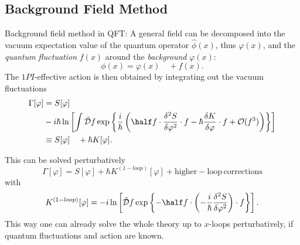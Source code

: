 \subsection{Background Field Method}
\begin{mybox}{Background field method in QFT:}
A general field can be decomposed into the vacuum expectation value of the quantum operator $\hat{\phi}(x)$, thus $\varphi(x)$, and the \emph{quantum fluctuation} $f(x)$ around the \emph{background} $\varphi(x)$:
\begin{equation}
	\phi(x) = \varphi(x) \quad + f(x).
\end{equation}
The $1PI$-effective action is then obtained by integrating out the vacuum fluctuations
\begin{align}
	\Gamma[\varphi] &= S[\varphi] \nonumber \\
	&-i  \hbar \ln\left[\int \tilde{\mathcal{D}}f \exp\left\{ \frac{i}{\hbar } \left(\half f \cdot \frac{\delta^2 S}{\delta \varphi^2} \cdot f-\hbar \frac{\delta K}{\delta \varphi} \cdot f + \mathcal{O}(f^3) \right)    \right\}\right] \\
	&\equiv S[\varphi] \quad + \hbar K[\varphi].
\end{align}
\end{mybox}
This can be solved perturbatively
\begin{equation}
	\Gamma[\varphi] = S[\varphi] + \hbar K^{(1-loop)} [\varphi] + \mathrm{higher-loop \, corrections}
\end{equation}
with 
\begin{equation}
	K^{(1-loop)} [\varphi] = -i \ln\left[\tilde{\mathcal{D}}f \exp \left\{- \half f\cdot \left(- \frac{i}{\hbar} \frac{\delta^2 S}{\delta \varphi^2}\right)\cdot f \right\}\right].
\end{equation}
This way one can already solve the whole theory up to $x$-loops perturbatively, if quantum fluctuations and action are known.


